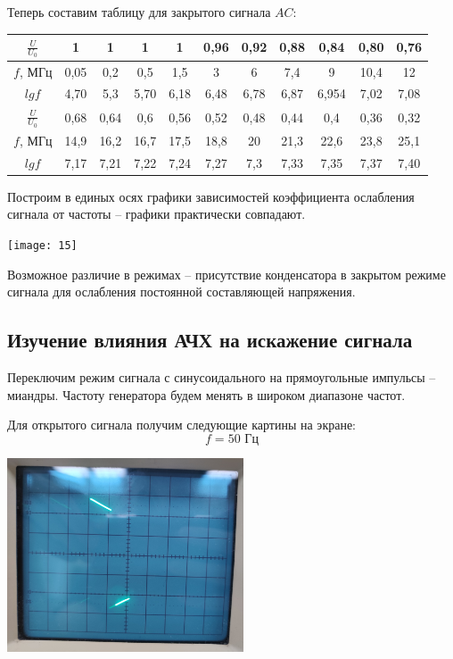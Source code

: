\documentclass[a4paper, 12pt]{article} %
\begin{document}
Теперь составим таблицу для закрытого сигнала $AC$:\\

\begin{tabular}{|c|c|c|c|c|c|c|c|c|c|c|}
 \hline 
 $\frac{U}{U_0}$ & 1 & 1 & 1 & 1 & 0,96 & 0,92 & 0,88 & 0,84 & 0,80 & 0,76 \\ 
 \hline 
 $f$, МГц & 0,05 & 0,2 & 0,5 & 1,5 & 3 & 6 & 7,4 & 9 & 10,4 & 12 \\ 
 \hline
 $lgf$ & 4,70 & 5,3 & 5,70 & 6,18 & 6,48 & 6,78 & 6,87 & 6,954 & 7,02 & 7,08 \\  
 \hline 
 $\frac{U}{U_0}$ & 0,68 & 0,64 & 0,6 & 0,56 & 0,52 & 0,48 & 0,44 & 0,4 & 0,36 & 0,32 \\ 
 \hline 
 $f$, МГц & 14,9 & 16,2 & 16,7 & 17,5 & 18,8 & 20 & 21,3 & 22,6 & 23,8 & 25,1 \\ 
 \hline 
 $lgf$ & 7,17 & 7,21 & 7,22 & 7,24 & 7,27 & 7,3 & 7,33 & 7,35 & 7,37 & 7,40 \\  
 \hline
\end{tabular}
 
\textbf{ }

Построим в единых осях графики зависимостей коэффициента ослабления сигнала от частоты -- графики практически совпадают.

\begin{center}
    \texttt{[image: 15]}
\end{center}

Возможное различие в режимах -- присутствие конденсатора в закрытом режиме сигнала для ослабления постоянной составляющей напряжения.\\


\subsection{Изучение влияния АЧХ на искажение сигнала}

Переключим режим сигнала с синусоидального на прямоугольные импульсы -- миандры. Частоту генератора будем менять в широком диапазоне частот.

Для открытого сигнала получим следующие картины на экране:
\[f = 50 \text{ Гц}\]

\begin{center}
    \includegraphics[width=7cm]{4}
\end{center}
\end{document}

